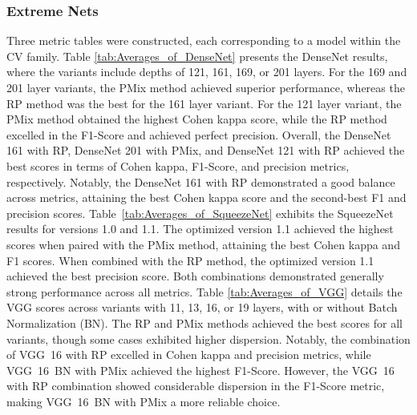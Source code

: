 \documentclass[final,3p,times,twocolumn]{elsarticle}
\begin{document}
\subsubsection{Extreme Nets}

Three metric tables were constructed, each corresponding to a model within the \gls{CV} family.
Table \ref{tab:Averages_of_DenseNet} presents the DenseNet results, where the variants include depths of 121, 161, 169, or 201 layers. For the 169 and 201 layer variants, the \gls{PMix} method achieved superior performance, whereas the \gls{RP} method was the best for the 161 layer variant. For the 121 layer variant, the \gls{PMix} method obtained the highest Cohen kappa score, while the \gls{RP} method excelled in the F1-Score and achieved perfect precision. Overall, the DenseNet 161 with \gls{RP}, DenseNet 201 with \gls{PMix}, and DenseNet 121 with \gls{RP} achieved the best scores in terms of Cohen kappa, F1-Score, and precision metrics, respectively. Notably, the DenseNet 161 with \gls{RP} demonstrated a good balance across metrics, attaining the best Cohen kappa score and the second-best F1 and precision scores.
Table~\ref{tab:Averages_of_SqueezeNet} exhibits the SqueezeNet results for versions 1.0 and 1.1. The optimized version 1.1 achieved the highest scores when paired with the \gls{PMix} method, attaining the best Cohen kappa and F1 scores. When combined with the \gls{RP} method, the optimized version 1.1 achieved the best precision score. Both combinations demonstrated generally strong performance across all metrics.
Table \ref{tab:Averages_of_VGG} details the VGG scores across variants with 11, 13, 16, or 19 layers, with or without Batch Normalization (BN). The \gls{RP} and \gls{PMix} methods achieved the best scores for all variants, though some cases exhibited higher dispersion. Notably, the combination of \mbox{VGG 16} with \gls{RP} excelled in Cohen kappa and precision metrics, while \mbox{VGG 16 BN} with \gls{PMix} achieved the highest F1-Score. However, the \mbox{VGG 16} with \gls{RP} combination showed considerable dispersion in the F1-Score metric, making \mbox{VGG 16 BN} with \gls{PMix} a more reliable choice.
\end{document}
